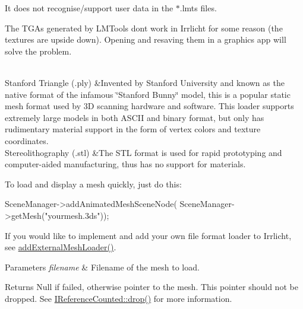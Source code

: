 \begin{longtabu}
\begin{DoxyItemize}
\item It does not recognise/support user data in the $\ast$.lmts files.~\newline

\item The T\+G\+As generated by L\+M\+Tools don\textquotesingle{}t work in Irrlicht for some reason (the textures are upside down). Opening and resaving them in a graphics app will solve the problem.  
\end{DoxyItemize}\\
Stanford Triangle (.ply) &Invented by Stanford University and known as the native format of the infamous \char`\"{}\+Stanford Bunny\char`\"{} model, this is a popular static mesh format used by 3D scanning hardware and software. This loader supports extremely large models in both A\+S\+C\+II and binary format, but only has rudimentary material support in the form of vertex colors and texture coordinates.  \\
Stereolithography (.stl) &The S\+TL format is used for rapid prototyping and computer-\/aided manufacturing, thus has no support for materials.  \\
\end{longtabu}


To load and display a mesh quickly, just do this\+: 
\begin{DoxyCode}
SceneManager->addAnimatedMeshSceneNode(
   SceneManager->getMesh(\textcolor{stringliteral}{"yourmesh.3ds"}));
\end{DoxyCode}
 If you would like to implement and add your own file format loader to Irrlicht, see \hyperlink{classirr_1_1scene_1_1ISceneManager_a808972cc001db86c0576c38b3b3fbbf7}{add\+External\+Mesh\+Loader()}. 
\begin{DoxyParams}{Parameters}
{\em filename} & Filename of the mesh to load. \\
\hline
\end{DoxyParams}
\begin{DoxyReturn}{Returns}
Null if failed, otherwise pointer to the mesh. This pointer should not be dropped. See \hyperlink{classirr_1_1IReferenceCounted_afb169a857e0d2cdb96b8821cb9bff17a}{I\+Reference\+Counted\+::drop()} for more information. 
\end{DoxyReturn}
